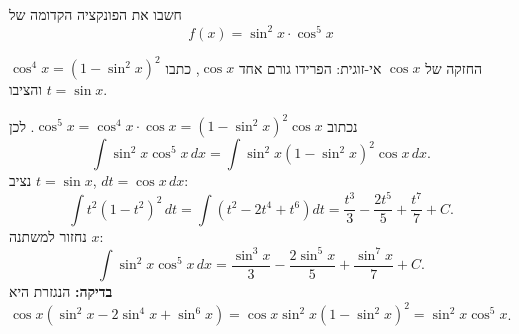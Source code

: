 
\begin{question}
חשבו את הפונקציה הקדומה של
\[ f(x)=\sin^2x\cdot\cos^5x \]
\end{question}

\begin{hint}
החזקה של $\cos x$ אי-זוגית: הפרידו גורם אחד $\cos x$, כתבו $\cos^4x=(1-\sin^2x)^2$ והציבו $t=\sin x$.
\end{hint}

\begin{solution}
נכתוב $\cos^5x=\cos^4x\cdot\cos x=(1-\sin^2x)^2\cos x$. לכן
\[ \int\sin^2x\cos^5x\,dx=\int\sin^2x(1-\sin^2x)^2\cos x\,dx. \]
נציב $t=\sin x$, $dt=\cos x\,dx$:
\[ \int t^2(1-t^2)^2\,dt=\int\left(t^2-2t^4+t^6\right)dt=\frac{t^3}3-\frac{2t^5}5+\frac{t^7}7+C. \]
נחזור למשתנה $x$:
\[ \boxed{\int\sin^2x\cos^5x\,dx=\frac{\sin^3x}{3}-\frac{2\sin^5x}{5}+\frac{\sin^7x}{7}+C}. \]
\textbf{בדיקה:} הנגזרת היא $\cos x\left(\sin^2x-2\sin^4x+\sin^6x\right)=\cos x\sin^2x(1-\sin^2x)^2=\sin^2x\cos^5x$.
\end{solution}
